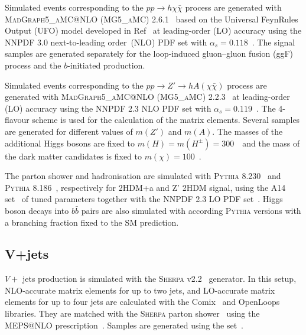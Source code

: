 \par Simulated events corresponding to the $pp\to h\chi\bar{\chi}$ process are generated with \textsc{MadGraph5\_aMC@NLO} (\textsc{MG5\_aMC}) 2.6.1~\cite{Alwall:2014hca} 
based on the Universal FeynRules Output (UFO) model developed in Ref~\cite{Abe:2018bpo} at leading-order (LO) accuracy using the NNPDF 3.0 next-to-leading order~(NLO) PDF set with $\alpha_s=0.118$~\cite{Ball:2014uwa}. 
The signal samples are generated separately for the loop-induced gluon--gluon fusion (ggF) process and the $b$-initiated production. 

\par Simulated events corresponding to the $pp\to Z'\to h A(\chi\bar{\chi})$ process are generated with \textsc{MadGraph5\_aMC@NLO} (\textsc{MG5\_aMC}) 2.2.3~\cite{Alwall:2014hca} 
at leading-order (LO) accuracy using the NNPDF 2.3 NLO PDF set with $\alpha_s=0.119$~\cite{Ball:2012cx}. 
The 4-flavour scheme is used for the calculation of the matrix elements. Several samples are generated for different values of $m(Z')$ and $m(A)$.
The masses of the additional Higgs bosons are fixed to $m(H)=m(H^{\pm})=300$~\GeV~and the mass of the dark matter candidates is fixed to $m(\chi)=100$~\GeV. 

\par The parton shower and hadronisation are simulated with \textsc{Pythia} 8.230~\cite{Sjostrand:2014zea} and \textsc{Pythia} 8.186~\cite{Sjostrand:2007gs}, respectively for 2HDM+a and Z' 2HDM signal,
using the A14 set~\cite{ATL-PHYS-PUB-2014-021} of tuned parameters together with the NNPDF 2.3 LO PDF set~\cite{Ball:2011mu}. 
Higgs boson decays into $b\bar{b}$ pairs are also simulated with according \textsc{Pythia} versions with a branching fraction fixed to the SM prediction.

\subsection{V+jets}

\par $V+$ jets production is simulated with the \textsc{Sherpa} v2.2~\cite{Bothmann:2019yzt} generator. 
In this setup, NLO-accurate matrix elements for up to two jets, and LO-accurate matrix elements for up to four jets are calculated with the Comix~\cite{Gleisberg:2008fv} and OpenLoops~\cite{Cascioli:2011va,Denner:2016kdg} libraries. 
They are matched with the \textsc{Sherpa} parton shower~\cite{Schumann:2007mg} using the MEPS@NLO prescription~\cite{Hoeche:2011fd,Hoeche:2012yf,Catani:2001cc,Hoeche:2009rj}.
Samples are generated using the \nnpdfnnlo set~\cite{Ball:2014uwa}.

